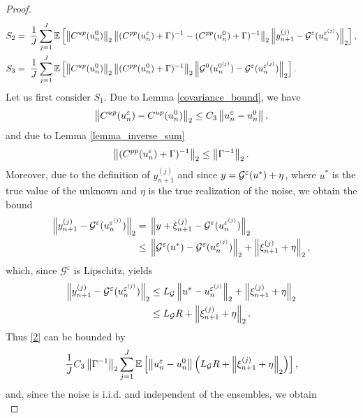 \documentclass[10pt]{article}
\begin{document}
\begin{proof}
\begin{align}
S_2 &= \; \frac{1}{J} \sum_{j=1}^J \mathbb{E} \left [ \left\|C^{up}(u_n^0)\right\|_2 \left\|(C^{pp}(u_n^{\varepsilon}) + \Gamma)^{-1} - (C^{pp}(u_n^0) + \Gamma)^{-1}\right\|_2 \left\|y_{n+1}^{(j)} - \mathcal{G}^{\varepsilon}(u_n^{\varepsilon^{(j)}})\right\|_2 \right ], \\ \label{4}
S_3 &= \; \frac{1}{J} \sum_{j=1}^J \mathbb{E} \left [ \left\|C^{up}(u_n^0)\right\|_2 \left\|(C^{pp}(u_n^0) + \Gamma)^{-1}\right\|_2 \left\|\mathcal{G}^0(u_n^{0^{(j)}}) - \mathcal{G}^{\varepsilon}(u_n^{\varepsilon^{(j)}})\right\|_2 \right ].
\end{align}
Let us first consider $S_1$. Due to Lemma \ref{covariance_bound}, we have
\begin{equation*}
\left\|C^{up}(u_n^{\varepsilon}) - C^{up}(u_n^0)\right\|_2 \le C_3 \left\|u_n^{\varepsilon} - u_n^0\right\|,
\end{equation*}
and due to Lemma \ref{lemma_inverse_sum}
\begin{equation*}
\left\|(C^{pp}(u_n^{\varepsilon}) + \Gamma)^{-1}\right\|_2 \le \left\|\Gamma^{-1}\right\|_2.
\end{equation*}
Moreover, due to the definition of $y_{n+1}^{(j)}$ and since $y = \mathcal G^\varepsilon(u^*) + \eta$, where $u^*$ is the true value of the unknown and $\eta$ is the true realization of the noise, we obtain the bound
\begin{align*}
\left\|y_{n+1}^{(j)} - \mathcal{G}^{\varepsilon}(u_n^{\varepsilon^{(j)}})\right\|_2 = & \; \left\|y + \xi_{n+1}^{(j)} - \mathcal{G}^{\varepsilon}(u_n^{\varepsilon^{(j)}})\right\|_2 \\
\le & \; \left\|\mathcal{G}^{\varepsilon}(u^*) - \mathcal{G}^{\varepsilon}(u_n^{\varepsilon^{(j)}})\right\|_2 + \left\|\xi_{n+1}^{(j)} + \eta\right\|_2,
\end{align*}
which, since $\mathcal{G}^{\varepsilon}$ is Lipschitz, yields
\begin{align*}
\left\|y_{n+1}^{(j)} - \mathcal{G}^{\varepsilon}(u_n^{\varepsilon^{(j)}})\right\|_2 \le & \; L_{\mathcal{G}} \left\|u^* - u_n^{\varepsilon^{(j)}}\right\|_2 + \left\|\xi_{n+1}^{(j)} + \eta\right\|_2 \\
\le & \; L_{\mathcal{G}} R + \left\|\xi_{n+1}^{(j)} + \eta\right\|_2.
\end{align*}
Thus \eqref{2} can be bounded by
\begin{equation*}
\frac{1}{J} C_3 \left\|\Gamma^{-1}\right\|_2 \sum_{j=1}^J \mathbb{E} \left [ \left\|u_n^{\varepsilon} - u_n^0\right\| \left( L_{\mathcal{G}} R + \left\|\xi_{n+1}^{(j)} + \eta\right\|_2 \right) \right ],
\end{equation*}
and, since the noise is i.i.d. and independent of the ensembles, we obtain
\begin{equation*}

\end{equation*}
\end{proof}
\end{document}
